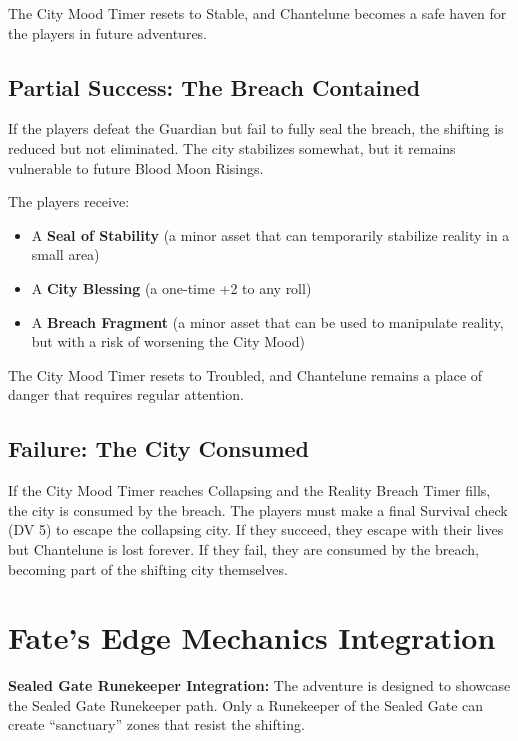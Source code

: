 \documentclass{article}
\begin{document}
The City Mood Timer resets to Stable, and Chantelune becomes a safe haven for the players in future adventures.

\subsection{Partial Success: The Breach Contained}

If the players defeat the Guardian but fail to fully seal the breach, the shifting is reduced but not eliminated. The city stabilizes somewhat, but it remains vulnerable to future Blood Moon Risings.

The players receive:
\begin{itemize}
    \item A \textbf{Seal of Stability} (a minor asset that can temporarily stabilize reality in a small area)
    \item A \textbf{City Blessing} (a one-time +2 to any roll)
    \item A \textbf{Breach Fragment} (a minor asset that can be used to manipulate reality, but with a risk of worsening the City Mood)
\end{itemize}

The City Mood Timer resets to Troubled, and Chantelune remains a place of danger that requires regular attention.

\subsection{Failure: The City Consumed}

If the City Mood Timer reaches Collapsing and the Reality Breach Timer fills, the city is consumed by the breach. The players must make a final Survival check (DV 5) to escape the collapsing city. If they succeed, they escape with their lives but Chantelune is lost forever. If they fail, they are consumed by the breach, becoming part of the shifting city themselves.

\section{Fate's Edge Mechanics Integration}

\begin{mechanicbox}
\textbf{Sealed Gate Runekeeper Integration:} The adventure is designed to showcase the Sealed Gate Runekeeper path. Only a Runekeeper of the Sealed Gate can create ``sanctuary'' zones that resist the shifting.
\end{mechanicbox}
\end{document}
